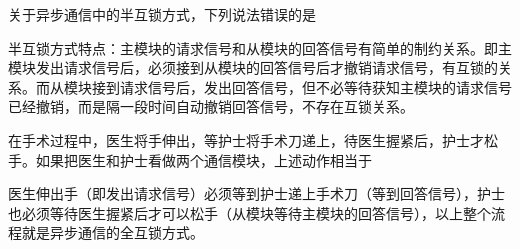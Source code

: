 \question 关于异步通信中的半互锁方式，下列说法错误的是
\par{}
\begin{solution}半互锁方式特点：主模块的请求信号和从模块的回答信号有简单的制约关系。即主模块发出请求信号后，必须接到从模块的回答信号后才撤销请求信号，有互锁的关系。而从模块接到请求信号后，发出回答信号，但不必等待获知主模块的请求信号已经撤销，而是隔一段时间自动撤销回答信号，不存在互锁关系。
\end{solution}
\question 在手术过程中，医生将手伸出，等护士将手术刀递上，待医生握紧后，护士才松手。如果把医生和护士看做两个通信模块，上述动作相当于
\par{}
\begin{solution}医生伸出手（即发出请求信号）必须等到护士递上手术刀（等到回答信号），护士也必须等待医生握紧后才可以松手（从模块等待主模块的回答信号），以上整个流程就是异步通信的全互锁方式。
\end{solution}
